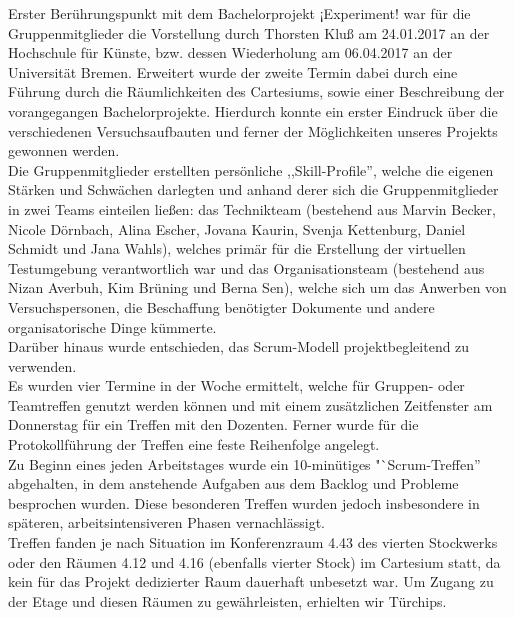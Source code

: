 \documentclass{Bericht}
\begin{document}
		Erster Berührungspunkt mit dem Bachelorprojekt ¡Experiment! war für die Gruppenmitglieder die Vorstellung durch Thorsten Kluß am 24.01.2017 an der Hochschule für Künste, bzw. dessen Wiederholung am 06.04.2017 an der Universität Bremen. Erweitert wurde der zweite Termin dabei durch eine Führung durch die Räumlichkeiten des Cartesiums, sowie einer Beschreibung der vorangegangen Bachelorprojekte. Hierdurch konnte ein erster Eindruck über die verschiedenen Versuchsaufbauten und ferner der Möglichkeiten unseres Projekts gewonnen werden.\\
Die Gruppenmitglieder erstellten persönliche ,,Skill-Profile'', welche die eigenen Stärken und Schwächen darlegten und anhand derer sich die Gruppenmitglieder in zwei Teams einteilen ließen: das Technikteam (bestehend aus Marvin Becker, Nicole Dörnbach, Alina Escher, Jovana Kaurin, Svenja Kettenburg, Daniel Schmidt und Jana Wahls), welches primär für die Erstellung der virtuellen Testumgebung verantwortlich war und das Organisationsteam (bestehend aus Nizan Averbuh, Kim Brüning und Berna Sen), welche sich um das Anwerben von Versuchspersonen, die Beschaffung benötigter Dokumente und andere organisatorische Dinge kümmerte.\\
Darüber hinaus wurde entschieden, das Scrum-Modell projektbegleitend zu verwenden.\\
Es wurden vier Termine in der Woche ermittelt, welche für Gruppen- oder Teamtreffen genutzt werden können und mit einem zusätzlichen Zeitfenster am Donnerstag für ein Treffen mit den Dozenten. Ferner wurde für die Protokollführung der Treffen eine feste Reihenfolge angelegt.\\
Zu Beginn eines jeden Arbeitstages wurde ein 10-minütiges "`Scrum-Treffen'' abgehalten, in dem anstehende Aufgaben aus dem Backlog und Probleme besprochen wurden. Diese besonderen Treffen wurden jedoch insbesondere in späteren, arbeitsintensiveren Phasen vernachlässigt.\\
Treffen fanden je nach Situation im Konferenzraum 4.43 des vierten Stockwerks oder den Räumen 4.12 und 4.16 (ebenfalls vierter Stock) im Cartesium statt, da kein für das Projekt dedizierter Raum dauerhaft unbesetzt war. Um Zugang zu der Etage und diesen Räumen zu gewährleisten, erhielten wir Türchips.\\
\end{document}
